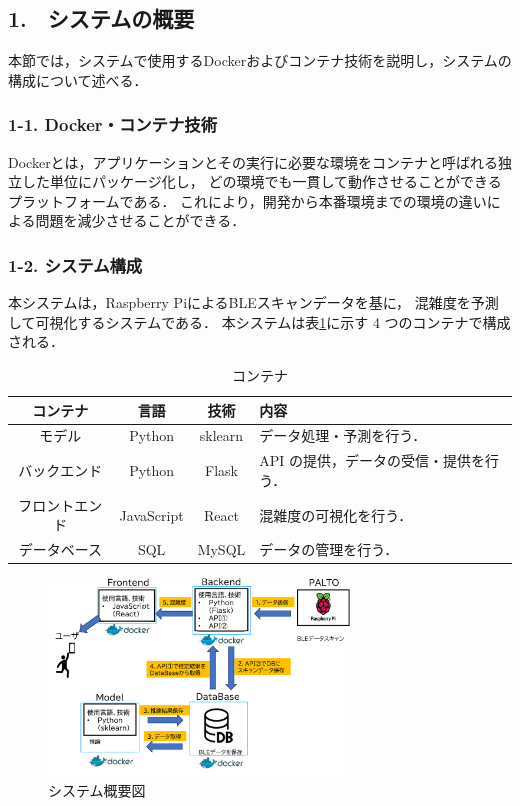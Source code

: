 \subsection*{1.　システムの概要}


本節では，システムで使用するDockerおよびコンテナ技術を説明し，システムの構成について述べる．


\subsubsection*{1-1. Docker・コンテナ技術}

Dockerとは，アプリケーションとその実行に必要な環境をコンテナと呼ばれる独立した単位にパッケージ化し，
どの環境でも一貫して動作させることができるプラットフォームである．
これにより，開発から本番環境までの環境の違いによる問題を減少させることができる．

\subsubsection*{1-2. システム構成}

本システムは，Raspberry PiによるBLEスキャンデータを基に，
混雑度を予測して可視化するシステムである．
本システムは表\ref{tbl:コンテナ}に示す 4 つのコンテナで構成される．

\begin{table}[tb]
	\centering
	\caption{コンテナ}
	\label{tbl:コンテナ}
	\small
	\doublerulesep=0.3pt
	\begin{tabular}{cccp{3cm}} \hline\hline\hline
		コンテナ & 言語 & 技術 & 内容 \\ \hline
		モデル & Python & sklearn &  データ処理・予測を行う． \\
		バックエンド & Python & Flask & API の提供，データの受信・提供を行う． \\
		フロントエンド & JavaScript & React & 混雑度の可視化を行う． \\
		データベース & SQL & MySQL & データの管理を行う． \\  \hline
	\end{tabular}
\end{table}

\begin{figure}[tb]
	\centering
	\includegraphics[width=8cm]{./outline_drawing.pdf}
	\caption{システム概要図}
	\label{fig:システム概要図}
\end{figure}

